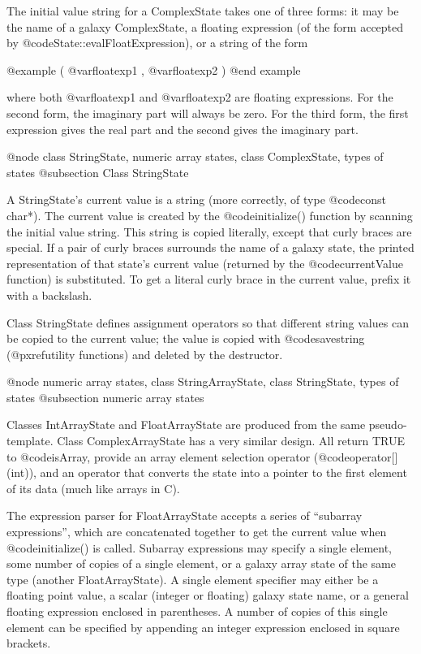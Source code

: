 The initial value string for a ComplexState takes one of three forms:
it may be the name of a galaxy ComplexState, a floating expression
(of the form accepted by @code{State::evalFloatExpression}), or a
string of the form

@example
( @var{floatexp1} , @var{floatexp2} )
@end example

where both @var{floatexp1} and @var{floatexp2} are floating expressions.
For the second form, the imaginary part will always be zero.  For the
third form, the first expression gives the real part and the second
gives the imaginary part.

@node class StringState, numeric array states, class ComplexState, types of states
@subsection Class StringState

A StringState's current value is a string (more correctly, of type
@code{const char*}).  The current value is created by the
@code{initialize()} function by scanning the initial value string.
This string is copied literally, except that curly braces are special.
If a pair of curly braces surrounds the name of a galaxy state, the
printed representation of that state's current value (returned by
the @code{currentValue} function) is substituted.  To get a literal
curly brace in the current value, prefix it with a backslash.

Class StringState defines assignment operators so that different
string values can be copied to the current value; the value is
copied with @code{savestring} (@pxref{utility functions})
and deleted by the destructor.

@node numeric array states, class StringArrayState, class StringState, types of states
@subsection numeric array states

Classes IntArrayState and FloatArrayState are produced from the same
pseudo-template.  Class ComplexArrayState has a very similar design.
All return TRUE to @code{isArray}, provide an array element selection
operator (@code{operator[](int)}), and an operator that converts
the state into a pointer to the first element of its data (much like
arrays in C).

The expression parser for FloatArrayState accepts a series of ``subarray
expressions'', which are concatenated together to get the current value
when @code{initialize()} is called.  Subarray expressions may specify
a single element, some number of copies of a single element, or a
galaxy array state of the same type (another FloatArrayState).  A
single element specifier may either be a floating point value, a
scalar (integer or floating) galaxy state name, or a general floating
expression enclosed in parentheses.  A number of copies of this
single element can be specified by appending an integer expression
enclosed in square brackets.


